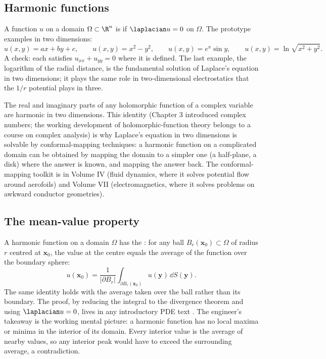 \subsection{Harmonic functions}

A function $u$ on a domain $\Omega \subset \R^{n}$ is
 if $\laplacian u = 0$ on $\Omega$. The
prototype examples in two dimensions:
\[
u(x, y) = ax + by + c, \qquad u(x, y) = x^{2} - y^{2}, \qquad u(x, y) = e^{x}\sin y, \qquad u(x, y) = \ln\sqrt{x^{2} + y^{2}}.
\]
A check: each satisfies $u_{xx} + u_{yy} = 0$ where it is defined.
The last example, the logarithm of the radial distance, is the
fundamental solution of Laplace's equation in two dimensions; it
plays the same role in two-dimensional electrostatics that the
$1/r$ potential plays in three.

The real and imaginary parts of any holomorphic function of a
complex variable are harmonic in two dimensions. This identity
(Chapter 3 introduced complex numbers; the working development of
holomorphic-function theory belongs to a course on complex
analysis) is why Laplace's equation in two dimensions is solvable
by conformal-mapping techniques: a harmonic function on a
complicated domain can be obtained by mapping the domain to a
simpler one (a half-plane, a disk) where the answer is known, and
mapping the answer back. The conformal-mapping toolkit is in
Volume IV (fluid dynamics, where it solves potential flow around
aerofoils) and Volume VII (electromagnetics, where it solves
problems on awkward conductor geometries).

\subsection{The mean-value property}

A harmonic function on a domain $\Omega$ has the
: for any ball $B_{r}(\mathbf{x}_{0})
\subset \Omega$ of radius $r$ centred at $\mathbf{x}_{0}$, the
value at the centre equals the average of the function over the
boundary sphere:
\[
u(\mathbf{x}_{0}) = \frac{1}{|\partial B_{r}|}\int_{\partial B_{r}(\mathbf{x}_{0})} u(\mathbf{y})\, \dd S(\mathbf{y}).
\]
The same identity holds with the average taken over the ball
rather than its boundary. The proof, by reducing the integral to
the divergence theorem and using $\laplacian u = 0$, lives in any
introductory PDE text \cite{text:strang2016}. The engineer's
takeaway is the working mental picture: a harmonic function has
no local maxima or minima in the interior of its domain. Every
interior value is the average of nearby values, so any interior
peak would have to exceed the surrounding average, a contradiction.

